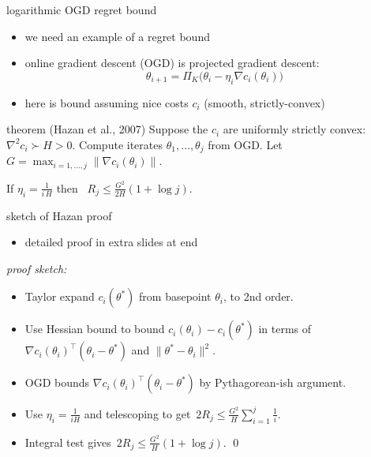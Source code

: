 \documentclass[xcolor={svgnames},
               hyperref={colorlinks,citecolor=DeepPink4,linkcolor=FireBrick,urlcolor=Maroon}]
               {beamer}
\newcommand{\grad}{\nabla}
\newcommand{\ds}{\displaystyle}
\begin{document}
\begin{frame}{logarithmic OGD regret bound}

\begin{itemize}
\item we need an example of a regret bound
\item online gradient descent (OGD) is projected gradient descent:
    $$\theta_{i+1} = \Pi_K \big(\theta_i - \eta_i \grad c_i(\theta_i)\big)$$
\item here is bound assuming nice costs $c_i$ (smooth, strictly-convex)
\end{itemize}

\begin{block}{theorem (Hazan et al., 2007)}
Suppose the $c_i$ are uniformly strictly convex: $\grad^2 c_i \succ H > 0$.  Compute iterates $\theta_1,\dots,\theta_j$ from OGD.  Let $G = \max_{i=1,\dots,j} \|\grad c_i(\theta_i)\|$.

If $\ds \eta_i = \frac{1}{i\,H}$ then \, $\ds \boxed{R_j \le \frac{G^2}{2 H} (1 + \log j).}$
\end{block}
\end{frame}


\begin{frame}{sketch of Hazan proof}
\begin{itemize}
\item detailed proof in extra slides at end
\end{itemize}

\bigskip
\noindent \emph{proof sketch:}

\begin{itemize}
\item Taylor expand $c_i(\theta^*)$ from basepoint $\theta_i$, to 2nd order.
\item Use Hessian bound to bound $c_i(\theta_i) - c_i(\theta^*)$ in terms of $\grad c_i(\theta_i)^\top (\theta_i - \theta^*)$ and $\|\theta^* - \theta_i\|^2$.
\item OGD bounds $\grad c_i(\theta_i)^\top (\theta_i - \theta^*)$ by Pythagorean-ish argument.
\item Use $\eta_i = \frac{1}{i H}$ and telescoping to get\, $\ds 2 R_j \le \frac{G^2}{H} \sum_{i=1}^j \frac{1}{i}$.
\item Integral test gives\, $\ds 2 R_j \le \frac{G^2}{H} (1 + \log j)$. \hfill \qed
\end{itemize}
\end{frame}
\end{document}

